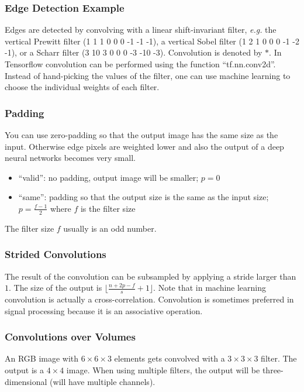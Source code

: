 \documentclass{article}
\begin{document}
\subsubsection{Edge Detection Example}
Edges are detected by convolving with a linear shift-invariant filter, \emph{e.g.} the vertical Prewitt filter
(1 1 1 0 0 0 -1 -1 -1), a vertical Sobel filter (1 2 1 0 0 0 -1 -2 -1), or a Scharr filter
(3 10 3 0 0 0 -3 -10 -3).
Convolution is denoted by $*$.
In Tensorflow convolution can be performed using the function ``tf.nn.conv2d''.
Instead of hand-picking the values of the filter, one can use machine learning to choose the individual weights of each filter.

\subsubsection{Padding}
You can use zero-padding so that the output image has the same size as the input.
Otherwise edge pixels are weighted lower and also the output of a deep neural networks becomes very small.
\begin{itemize}
  \item ``valid'': no padding, output image will be smaller; $p=0$
  \item ``same'': padding so that the output size is the same as the input size; $p=\frac{f-1}{2}$ where $f$ is the filter size
\end{itemize}
The filter size $f$ usually is an odd number.

\subsubsection{Strided Convolutions}
The result of the convolution can be subsampled by applying a stride larger than $1$.
The size of the output is $\lfloor\frac{n+2p-f}{s}+1\rfloor$.
Note that in machine learning convolution is actually a cross-correlation.
Convolution is sometimes preferred in signal processing because it is an associative operation.

\subsubsection{Convolutions over Volumes}
An RGB image with $6\times 6\times 3$ elements gets convolved with a $3\times 3\times 3$ filter.
The output is a $4\times 4$ image.
When using multiple filters, the output will be three-dimensional (will have multiple channels).
\end{document}
